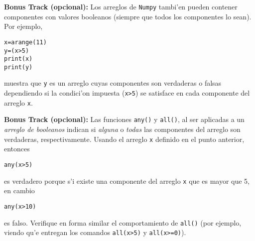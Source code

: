 \documentclass[11pt]{exam}
\begin{document}
\begin{questions}
\item \textbf{Bonus Track (opcional):} Los arreglos de \texttt{Numpy} tambi'en pueden contener componentes con valores booleanos (siempre que todos los componentes lo sean). Por ejemplo,
\begin{verbatim}
x=arange(11)
y=(x>5)
print(x)
print(y)
\end{verbatim}
muestra que \texttt{y} es un arreglo cuyas componentes son verdaderas o falsas dependiendo si la condici'on impuesta (\texttt{x>5}) se satisface en cada componente del arreglo \texttt{x}.
\item \textbf{Bonus Track (opcional):} Las funciones \texttt{any()} y \texttt{all()}, al ser aplicadas a un \textit{arreglo de booleanos} indican si \textit{alguna} o \textit{todas} las componentes del arreglo son verdaderas, respectivamente. Usando el arreglo \texttt{x} definido en el punto anterior, entonces
\begin{verbatim}
any(x>5)
\end{verbatim}
es verdadero porque s'i existe una componente del arreglo \texttt{x} que es mayor que 5, en cambio 
\begin{verbatim}
any(x>10)
\end{verbatim}
es falso. Verifique en forma similar el comportamiento de \texttt{all()} (por ejemplo, viendo qu'e entregan los comandos \texttt{all(x>5)} y \texttt{all(x>=0)}).
\end{questions}
\end{document}
